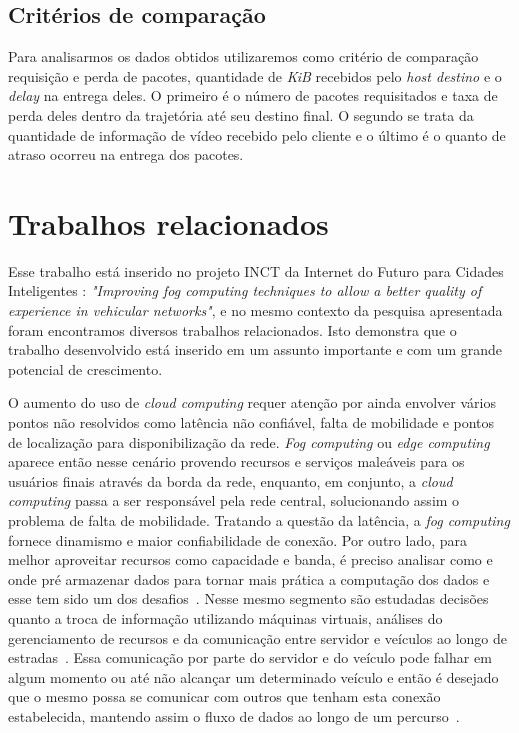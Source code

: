 \documentclass[12pt]{article}
\begin{document}
\subsection{Critérios de comparação}
    Para analisarmos os dados obtidos utilizaremos como critério de comparação requisição e perda de pacotes, quantidade de \textit{KiB} recebidos pelo \textit{host destino} e o \textit{delay} na entrega deles. O primeiro é o número de pacotes requisitados e taxa de perda deles dentro da trajetória até seu destino final. O segundo se trata da quantidade de informação de vídeo recebido pelo cliente e o último é o quanto de atraso ocorreu na entrega dos pacotes.

\section{Trabalhos relacionados} \label{sec:trabalhos}
	Esse trabalho está inserido no projeto INCT da Internet do Futuro para Cidades Inteligentes : \textit{"Improving fog computing techniques to allow a better quality of experience in vehicular networks"}, e no mesmo contexto da pesquisa apresentada foram encontramos diversos trabalhos relacionados. Isto demonstra que o trabalho desenvolvido está inserido em um assunto importante e com um grande potencial de crescimento.
    
    O aumento do uso de \textit{cloud computing} requer atenção por ainda envolver vários pontos não resolvidos como latência não confiável, falta de mobilidade e pontos de localização para disponibilização da rede. \textit{Fog computing} ou \textit{edge computing} aparece então nesse cenário provendo recursos e serviços maleáveis para os usuários finais através da borda da rede, enquanto, em conjunto, a \textit{cloud computing} passa a ser responsável pela rede central, solucionando assim o problema de falta de mobilidade. Tratando a questão da latência, a \textit{fog computing} fornece dinamismo e maior confiabilidade de conexão. Por outro lado, para melhor aproveitar recursos como capacidade e banda, é preciso analisar como e onde pré armazenar dados para tornar mais prática a computação dos dados e esse tem sido um dos desafios~\cite{Yi:2015:SFC:2757384.2757397}. Nesse mesmo segmento são estudadas decisões quanto a troca de informação utilizando máquinas virtuais, análises do gerenciamento de recursos e da comunicação entre servidor e veículos ao longo de estradas~\cite{Yao:2015:MEV:2915680.2915702}. Essa comunicação por parte do servidor e do veículo pode falhar em algum momento ou até não alcançar um determinado veículo e então é desejado que o mesmo possa se comunicar com outros que tenham esta conexão estabelecida, mantendo assim o fluxo de dados ao longo de um percurso~\cite{Simula.simula.2416}.
    
\end{document}
